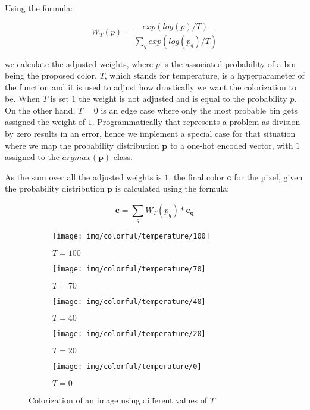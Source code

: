 Using the formula:

\begin{equation}
    W_T(p) = \frac{exp(log(p)/T)}{\sum_{q}{exp(log(p_q)/T)}}\label{eq:annealed_mean}
\end{equation}

we calculate the adjusted weights, where $p$ is the associated 
probability of a bin being the proposed color. $T$, which stands 
for temperature, is a hyperparameter of the function and it is used to 
adjust how drastically we want the colorization to be. When $T$ is set $1$
the weight is not adjusted and is equal to the probability $p$. On
the other hand, $T=0$ is an edge case where only the most probable bin 
gets assigned the weight of $1$. Programmatically that represents a problem 
as division  by zero results in an error, hence we implement a special case
for that situation where we map the probability distribution $\mathbf{p}$
to a one-hot encoded vector, with $1$ assigned to the $argmax(\mathbf{p})$
class.

As the sum over all the adjusted weights is $1$, the final color $\mathbf{c}$ 
for the pixel, given the probability distribution $\mathbf{p}$ is calculated 
using the formula:

\begin{equation}
    \mathbf{c} = \sum_{q}W_T(p_q) * \mathbf{c_q}\label{eq:weighed sum}
\end{equation}

\begin{figure}[!ht]
	\centering
	\begin{subfigure}{.19\textwidth}
		\centering
		\texttt{[image: img/colorful/temperature/100]}
		\caption{$T=100$}
	\end{subfigure}
	\begin{subfigure}{.19\textwidth}
		\centering
		\texttt{[image: img/colorful/temperature/70]}
		\caption{$T=70$}
	\end{subfigure}
	\begin{subfigure}{.19\textwidth}
		\centering
		\texttt{[image: img/colorful/temperature/40]}
		\caption{$T=40$}
	\end{subfigure}
	\begin{subfigure}{.19\textwidth}
		\centering
		\texttt{[image: img/colorful/temperature/20]}
		\caption{$T=20$}
	\end{subfigure}
	\begin{subfigure}{.19\textwidth}
		\centering
		\texttt{[image: img/colorful/temperature/0]}
		\caption{$T=0$}
	\end{subfigure}
	\caption{Colorization of an image using different values of $T$}
	\label{fig:temperature}
\end{figure}


